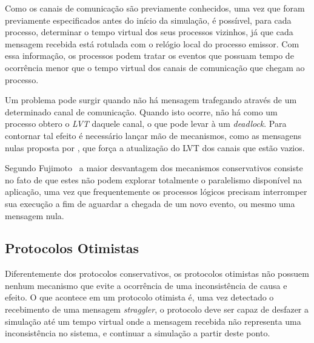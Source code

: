Como os canais de comunicação são previamente conhecidos, uma vez que foram previamente especificados antes do início da simulação, é possíıvel, para cada processo, determinar o tempo virtual dos seus processos vizinhos, já que cada mensagem recebida está rotulada com o relógio local do processo emissor. Com essa informação, os processos podem tratar os eventos que possuam tempo de ocorrência menor que o tempo virtual dos canais de comunicação que chegam ao processo.



Um problema pode surgir quando não há mensagem trafegando através de um determinado canal de comunicação. Quando isto ocorre, não há como um processo obtero o \textit{LVT} daquele canal, o que pode levar à um \textit{deadlock}. Para contornar tal efeito é necessário lançar mão de mecanismos, como as mensagens nulas proposta por \cite{CMB1}, que força a atualização do LVT dos canais que estão vazios.


Segundo Fujimoto~\cite{FUJIMOTO} a maior desvantagem dos mecanismos conservativos consiste no fato de que estes não podem explorar totalmente o paralelismo disponível na aplicação, uma vez que frequentemente os processos lógicos precisam interromper sua execução a fim de aguardar a chegada de um novo evento, ou mesmo uma mensagem nula.

\subsection{Protocolos Otimistas}


Diferentemente dos protocolos conservativos, os protocolos otimistas não possuem nenhum mecanismo que evite a ocorrência de uma inconsistência de causa e efeito. O que acontece em um protocolo otimista é, uma vez detectado o recebimento de uma mensagem \textit{straggler}, o protocolo deve ser capaz de desfazer a simulação até um tempo virtual onde a mensagem recebida não representa uma inconsistência no sistema, e continuar a simulação a partir deste ponto.

